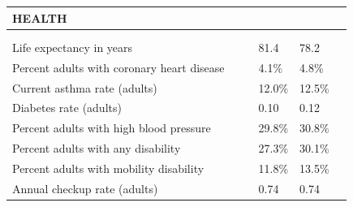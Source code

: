 \documentclass[9pt]{report}
\begin{document}
\newpage
\setlength{\tabcolsep}{.01in} %
\begin{tabular}{p{.10in}p{.10in}p{.10in}p{3.7in}>{\hfill}p{.85in}>{\hfill}p{.85in}>{\hfill}p{.85in}>{\hfill}p{.85in}p{0.1in}}
\multicolumn{9}{l}{\parbox{7.1in}{\raggedright{\large{\strut\textbf{HEALTH}\strut}}}} \\ 
\hline
\multicolumn{4}{l}{\parbox{3.5in}{\raggedright{\textbf{}}}} & \multicolumn{1}{r}{\parbox{.85in}{\strut\raggedleft{\textbf{}\strut}}} & \multicolumn{1}{r}{\parbox{.85in}{\strut\raggedleft{\textbf{}\strut}}} & \multicolumn{1}{r}{\parbox{.85in}{\strut{}}} & \multicolumn{1}{r}{\parbox{.85in}{\strut{}}} & \\ 
\multicolumn{9}{l}{} \\ 
\multicolumn{4}{l}{\parbox{3.6in}{\strut\raggedright{{Life expectancy in years}}\strut}} &  &  & 81.4 & 78.2 & \multicolumn{1}{l}{}  \\ 
\multicolumn{4}{l}{\parbox{3.6in}{\strut\raggedright{{Percent adults with coronary heart disease}}\strut}} &  &  & 4.1\% & 4.8\% & \multicolumn{1}{l}{}  \\ 
\multicolumn{4}{l}{\parbox{3.6in}{\strut\raggedright{{Current asthma rate (adults)}}\strut}} &  &  & 12.0\% & 12.5\% & \multicolumn{1}{l}{}  \\ 
\multicolumn{4}{l}{\parbox{3.6in}{\strut\raggedright{{Diabetes rate (adults)}}\strut}} &  &  & 0.10 & 0.12 & \multicolumn{1}{l}{}  \\ 
\multicolumn{4}{l}{\parbox{3.6in}{\strut\raggedright{{Percent adults with high blood pressure}}\strut}} &  &  & 29.8\% & 30.8\% & \multicolumn{1}{l}{}  \\ 
\multicolumn{4}{l}{\parbox{3.6in}{\strut\raggedright{{Percent adults with any disability}}\strut}} &  &  & 27.3\% & 30.1\% & \multicolumn{1}{l}{}  \\ 
\multicolumn{4}{l}{\parbox{3.6in}{\strut\raggedright{{Percent adults with mobility disability}}\strut}} &  &  & 11.8\% & 13.5\% & \multicolumn{1}{l}{}  \\ 
\multicolumn{4}{l}{\parbox{3.6in}{\strut\raggedright{{Annual checkup rate (adults)}}\strut}} &  &  & 0.74 & 0.74 & \multicolumn{1}{l}{}  \\ 

\end{tabular}
\end{document}
